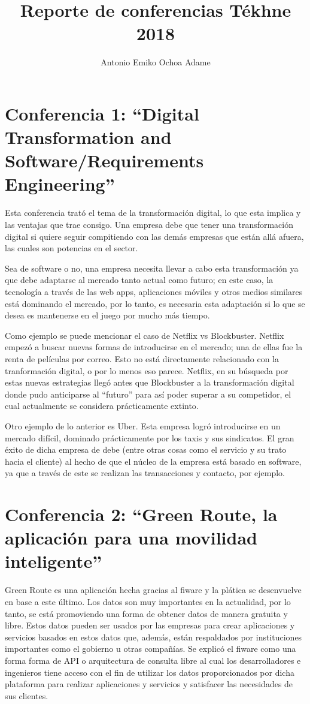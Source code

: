 \documentclass{article}
\title{Reporte de conferencias Tékhne 2018}
\author{Antonio Emiko Ochoa Adame}
\begin{document}
\maketitle

\section{Conferencia 1: ``Digital Transformation and Software/Requirements  Engineering''}
Esta conferencia trató el tema de la transformación digital, lo que esta implica y las ventajas que trae consigo. Una empresa debe que tener una transformación digital si quiere seguir compitiendo con las demás empresas que están allá afuera, las cuales son potencias en el sector.

Sea de software o no, una empresa necesita llevar a cabo esta transformación ya que debe adaptarse al mercado tanto actual como futuro; en este caso, la tecnología a través de las web apps, aplicaciones móviles y otros medios similares está dominando el mercado, por lo tanto, es necesaria esta adaptación si lo que se desea es mantenerse en el juego por mucho más tiempo.

Como ejemplo se puede mencionar el caso de Netflix vs Blockbuster. Netflix empezó a buscar nuevas formas de introducirse en el mercado; una de ellas fue la renta de películas por correo. Esto no está directamente relacionado con la tranformación digital, o por lo menos eso parece. Netflix, en su búsqueda por estas nuevas estrategias llegó antes que Blockbuster a la transformación digital donde pudo anticiparse al ``futuro'' para así poder superar a su competidor, el cual actualmente se considera prácticamente extinto.

Otro ejemplo de lo anterior es Uber. Esta empresa logró introducirse en un mercado difícil, dominado prácticamente por los taxis y sus sindicatos. El gran éxito de dicha empresa de debe (entre otras cosas como el servicio y su trato hacia el cliente) al hecho de que el núcleo de la empresa está basado en software, ya que a través de este se realizan las transacciones y contacto, por ejemplo.

\section{Conferencia 2: ``Green Route, la aplicación para una movilidad inteligente''}
Green Route es una aplicación hecha gracias al fiware y la plática se desenvuelve en base a este último.
Los datos son muy importantes en la actualidad, por lo tanto, se está promoviendo una forma de obtener datos de manera gratuita y libre.
Estos datos pueden ser usados por las empresas para crear aplicaciones y servicios basados en estos datos que, además, están respaldados por instituciones importantes como el gobierno u otras compañías.
Se explicó el fiware como una forma forma de API o arquitectura de consulta libre al cual los desarrolladores e ingenieros tiene acceso con el fin de utilizar los datos proporcionados por dicha plataforma para realizar aplicaciones y servicios y satisfacer las necesidades de sus clientes.
\end{document}
